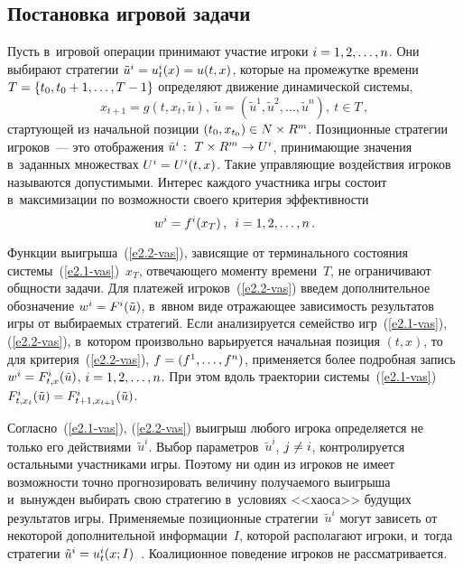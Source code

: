 \begin{multicols}{2}
    \subsection{Постановка игровой задачи}
    
    Пусть в~игровой операции принимают участие игроки $i\hm= 1, 2,\ldots, n$. Они 
выбирают стратегии $\tilde{u}^i\hm= u_t^i(x)\hm= u(t,x)$, которые на промежутке 
времени $T\hm=\{t_0,t_0+1,\ldots , T-1\}$ определяют движение динамической 
системы, 
    \begin{equation}
    x_{t+1}= g\left(t,x_t,\tilde{u}\right),\ \tilde{u}=\left( \tilde{u}^1, \tilde{u}^2, \ldots 
, \tilde{u}^n\right),\ t\in T\,,
    \label{e2.1-vas}
    \end{equation}
стартующей из начальной позиции $(t_0, x_{t_0})\hm\in N\times R^m$. 
Позиционные стратегии игроков~--- это отображения $\tilde{u}^i:\ T\times R^m \hm\to 
U^i$, принимающие значения в~заданных множествах $U^i\hm= U^i(t,x)$. Такие 
управляющие воздействия игроков называются допустимыми. Интерес каждого 
участника игры состоит в~максимизации по возможности своего критерия 
эффективности
\begin{equation}
w^i=f^i(x_T)\,,\enskip i=1,2,\ldots, n\,.
\label{e2.2-vas}
\end{equation}
    
    Функции выигрыша~(\ref{e2.2-vas}), зависящие от терминального состояния 
системы~(\ref{e2.1-vas})~$x_T$, отвечающего моменту времени~$T$, не 
ограничивают общности задачи. Для платежей игроков~(\ref{e2.2-vas}) введем 
дополнительное обозначение $w^i\hm= F^i(\tilde{u})$, в~явном виде отражающее 
зависимость результатов игры от выбираемых стратегий. Если анализируется 
семейство игр~(\ref{e2.1-vas}), (\ref{e2.2-vas}), в~котором произвольно варьируется 
начальная позиция $(t,x)$, то для критерия~(\ref{e2.2-vas}), $f\hm= (f^1,\ldots , f^n)$, 
применяется более подробная запись $w^i\hm= F^i_{t,x}(\tilde{u})$, $i\hm=1,2,\ldots, 
n$. При этом вдоль траектории системы~(\ref{e2.1-vas}) $F^i_{t,x_t}(\tilde{u})\hm= 
F^i_{t+1, x_{t+1}}(\tilde{u})$.
    
    Согласно~(\ref{e2.1-vas}), (\ref{e2.2-vas}) выигрыш любого игрока 
определяется не только его действиями~$\tilde{u}^i$. Выбор 
параметров~$\tilde{u}^i$, $j\hm\not= i$, контролируется остальными участниками 
игры. Поэтому ни один из игроков не имеет возможности точно прогнозировать 
величину получаемого выигрыша и~вынужден выбирать свою стратегию в~условиях 
<<хаоса>> будущих результатов игры. Применяемые позиционные 
стратегии~$\tilde{u}^i$ могут зависеть от некоторой дополнительной 
информации~$I$, которой располагают игроки, и~тогда стратегии $\tilde{u}^i\hm= 
u_t^i(x;I)$~\cite{1-vas, 4-vas}. Коалиционное поведение игроков не рассматривается.
    

\end{multicols}
